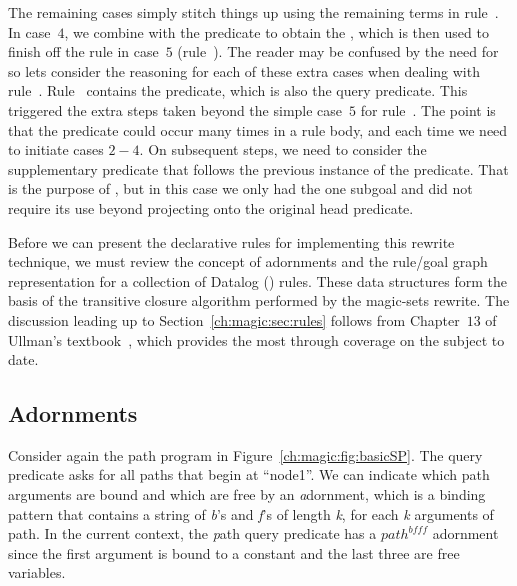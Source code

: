 The remaining cases simply stitch things up using the remaining terms in
rule~.  In case~$4$, we combine  with the 
predicate to obtain the , which is then used to finish off the
rule in case~$5$ (rule~).  The reader may be confused by the need
for  so lets consider the reasoning for each of these extra
cases when dealing with rule~.  Rule~ contains the 
predicate, which is also the query predicate.  This triggered the extra steps
taken beyond the simple case~$5$ for rule~.  The point is that the
 predicate could occur many times in a rule body, and each time we
need to initiate cases $2-4$.  On subsequent steps, we need to consider the
supplementary predicate that follows the previous instance of the 
predicate.  That is the purpose of , but in this case we only
had the one  subgoal and did not require its use beyond projecting
onto the original head predicate.

Before we can present the declarative rules for implementing this rewrite
technique, we must review the concept of adornments and the rule/goal graph
representation for a collection of Datalog (\OVERLOG) rules.  These data
structures form the basis of the transitive closure algorithm performed by the
magic-sets rewrite.  The discussion leading up to
Section~\ref{ch:magic:sec:rules} follows from Chapter~$13$ of Ullman's
textbook~, which provides the most through coverage on the
subject to date.


\subsection{Adornments}

Consider again the path program in Figure~\ref{ch:magic:fig:basicSP}.  The
query predicate  asks for all paths that begin at
``node1''.  We can indicate which path arguments are bound and which are free
by an {\emph adornment}, which is a binding pattern that contains a string of
{\emph b's} and {\emph f's} of length {\emph k}, for each {\emph k} arguments
of path.  In the current context, the {\emph path} query predicate has a
$path^{bfff}$ adornment since the first argument is bound to a constant and the
last three are free variables.

